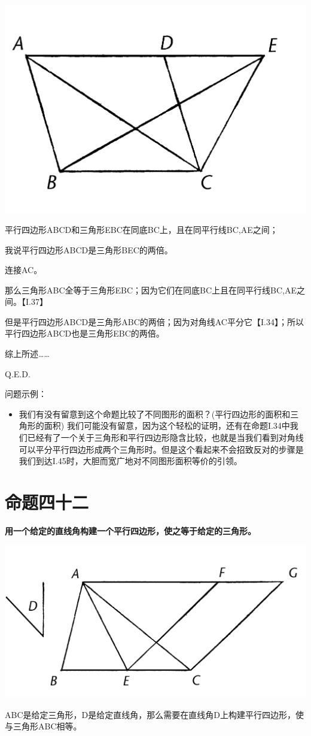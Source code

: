 \documentclass[
]{book}
\providecommand{\tightlist}{%
  \setlength{\itemsep}{0pt}\setlength{\parskip}{0pt}}
\begin{document}
\includegraphics[width=0.4\linewidth]{./image/img540}

平行四边形ABCD和三角形EBC在同底BC上，且在同平行线BC,AE之间；

我说平行四边形ABCD是三角形BEC的两倍。

连接AC。

那么三角形ABC全等于三角形EBC；因为它们在同底BC上且在同平行线BC,AE之间。【I.37】

但是平行四边形ABCD是三角形ABC的两倍；因为对角线AC平分它【I.34】；所以平行四边形ABCD也是三角形EBC的两倍。

综上所述\ldots\ldots{}

Q.E.D.

问题示例：

\begin{itemize}
\tightlist
\item
  我们有没有留意到这个命题比较了不同图形的面积？(平行四边形的面积和三角形的面积) 我们可能没有留意，因为这个轻松的证明，还有在命题I.34中我们已经有了一个关于三角形和平行四边形隐含比较，也就是当我们看到对角线可以平分平行四边形成两个三角形时。但是这个看起来不会招致反对的步骤是我们到达I.45时，大胆而宽广地对不同图形面积等价的引领。
\end{itemize}

\hypertarget{ux547dux9898ux56dbux5341ux4e8c}{%
\section{命题四十二}\label{ux547dux9898ux56dbux5341ux4e8c}}

\textbf{用一个给定的直线角构建一个平行四边形，使之等于给定的三角形。}

\includegraphics[width=0.5\linewidth]{./image/img542}

ABC是给定三角形，D是给定直线角，那么需要在直线角D上构建平行四边形，使与三角形ABC相等。
\end{document}
